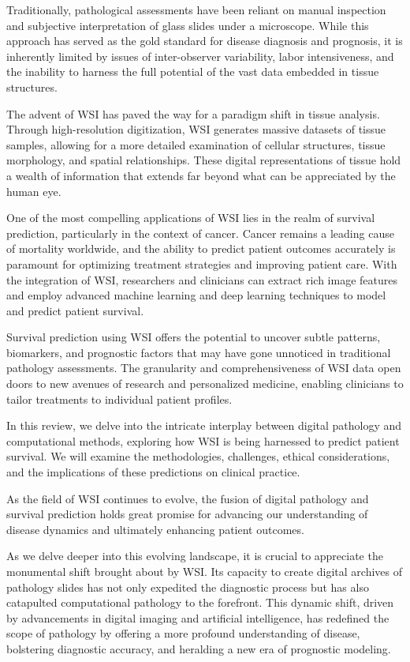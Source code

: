 \documentclass[journal,twoside,web]{ieeecolor}
\begin{document}
Traditionally, pathological assessments have been reliant on manual inspection and subjective interpretation of glass slides under a microscope. While this approach has served as the gold standard for disease diagnosis and prognosis, it is inherently limited by issues of inter-observer variability, labor intensiveness, and the inability to harness the full potential of the vast data embedded in tissue structures.

The advent of WSI has paved the way for a paradigm shift in tissue analysis. Through high-resolution digitization, WSI generates massive datasets of tissue samples, allowing for a more detailed examination of cellular structures, tissue morphology, and spatial relationships. These digital representations of tissue hold a wealth of information that extends far beyond what can be appreciated by the human eye.

One of the most compelling applications of WSI lies in the realm of survival prediction, particularly in the context of cancer. Cancer remains a leading cause of mortality worldwide, and the ability to predict patient outcomes accurately is paramount for optimizing treatment strategies and improving patient care. With the integration of WSI, researchers and clinicians can extract rich image features and employ advanced machine learning and deep learning techniques to model and predict patient survival.

Survival prediction using WSI offers the potential to uncover subtle patterns, biomarkers, and prognostic factors that may have gone unnoticed in traditional pathology assessments. The granularity and comprehensiveness of WSI data open doors to new avenues of research and personalized medicine, enabling clinicians to tailor treatments to individual patient profiles.

In this review, we delve into the intricate interplay between digital pathology and computational methods, exploring how WSI is being harnessed to predict patient survival. We will examine the methodologies, challenges, ethical considerations, and the implications of these predictions on clinical practice.

As the field of WSI continues to evolve, the fusion of digital pathology and survival prediction holds great promise for advancing our understanding of disease dynamics and ultimately enhancing patient outcomes.

As we delve deeper into this evolving landscape, it is crucial to appreciate the monumental shift brought about by WSI. Its capacity to create digital archives of pathology slides has not only expedited the diagnostic process but has also catapulted computational pathology to the forefront. This dynamic shift, driven by advancements in digital imaging and artificial intelligence, has redefined the scope of pathology by offering a more profound understanding of disease, bolstering diagnostic accuracy, and heralding a new era of prognostic modeling.
\end{document}
